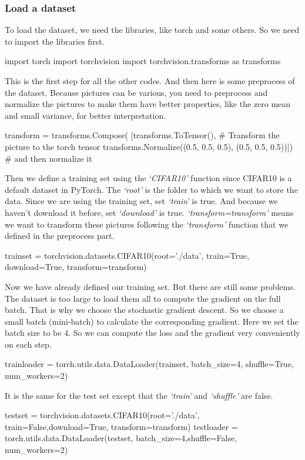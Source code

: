 \subsubsection{Load a dataset}
To load the dataset, we need the libraries, like torch and some others. So we need to import the libraries first.
\begin{python}
import torch
import torchvision
import torchvision.transforms as transforms
\end{python}
This is the first step for all the other codes. And then here is some preprocess of the dataset. Because pictures can be various, you need to preprocess and normalize the pictures to make them have better properties, like the zero mean and small variance, for better interpretation.
\begin{python}
transform = transforms.Compose(
    [transforms.ToTensor(), # Transform the picture to the torch tensor
     transforms.Normalize((0.5, 0.5, 0.5), (0.5, 0.5, 0.5))]) # and then normalize it
\end{python}
Then we define a training set using the \emph{`CIFAR10'} function since CIFAR10 is a default dataset in PyTorch.  The \emph{`root'} is the folder to which we want to store the data. Since we are using the training set, set \emph{`train'} is true. And because we haven't download it before, set \emph{`download'} is true. \emph{`transform=transform'} means we want to transform these pictures following the \emph{`transform'} function that we defined in the preprocess part.
\begin{python}
trainset = torchvision.datasets.CIFAR10(root='./data', train=True, download=True, transform=transform)
\end{python}
Now we have already defined our training set. But there are still some problems. The dataset is too large to load them all to compute the gradient on the full batch. That is why we choose the stochastic gradient descent. So we choose a small batch (mini-batch) to calculate the corresponding gradient. Here we set the batch size to be 4. So we can compute the loss and the gradient very conveniently on each step.  
\begin{python}
trainloader = torch.utils.data.DataLoader(trainset, batch_size=4, shuffle=True, num_workers=2)
\end{python}
It is the same for the test set except that the \emph{`train'} and \emph{`shuffle'} are false. 
\begin{python}
testset = torchvision.datasets.CIFAR10(root='./data', train=False,download=True, transform=transform)
testloader = torch.utils.data.DataLoader(testset, batch_size=4,shuffle=False, num_workers=2)
\end{python}

